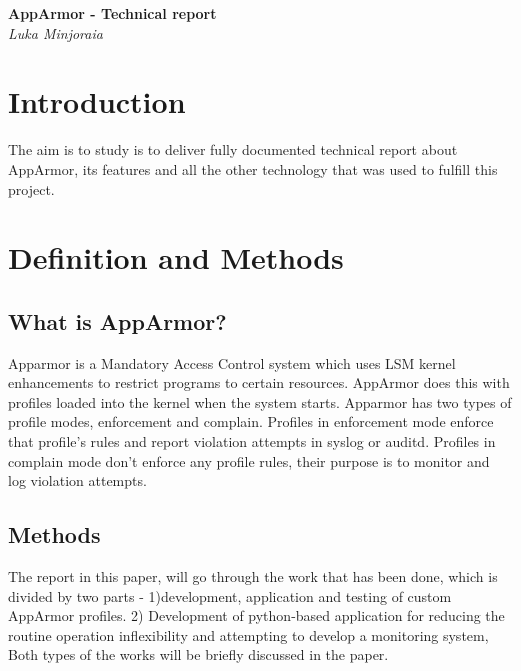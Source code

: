\documentclass[12pt,a4paper]{article} %
\newcommand\BackgroundStructure{ %
\setlength{\unitlength}{1mm} %

\setlength\fboxsep{0mm} %
\setlength\fboxrule{0.5mm} %
\put(10, 20pr){\fcolorbox{black}{gray!5}{\framebox(155,247){}}} %
\put(165, 20){\fcolorbox{black}{gray!10}{\framebox(37,247){}}} %
\put(10, 262){\fcolorbox{black}{white!10}{\framebox(192, 25){}}} %
\put(175, 263){\texttt{[image: ]}} %
}
\begin{document}


\begin{titlepage}
   \begin{center}
      \Large\textbf{AppArmor - Technical report}\\
      \large\textit{Luka Minjoraia}
   \end{center}
\end{titlepage}


\section{Introduction}
The aim is to study is to deliver fully documented technical report about AppArmor, its features and all the other technology that was used to fulfill this project. 
\section{Definition and Methods}
\subsection{What is AppArmor?}
Apparmor is a Mandatory Access Control system which uses LSM kernel enhancements to restrict programs to certain resources. AppArmor does this with profiles loaded into the kernel when the system starts. Apparmor has two types of profile modes, enforcement and complain. Profiles in enforcement mode enforce that profile's rules and report violation attempts in syslog or auditd. Profiles in complain mode don't enforce any profile rules, their purpose is to monitor and log violation attempts.
\subsection{Methods}
The report in this paper, will go through the work that has been done, which is divided by two parts - 1)development, application and testing of custom AppArmor profiles. 2) Development of python-based application for reducing the routine operation inflexibility and attempting to develop a monitoring system, Both types of the works will be briefly discussed in the paper.
\end{document}
